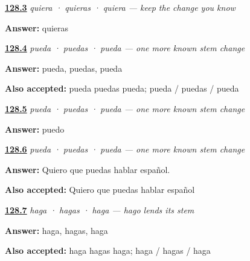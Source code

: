 \noindent\begin{minipage}[t]{\linewidth}
\raggedright
\hyperlink{review-ES-C18-querer-subjuntivo-wanted}{\textbf{128.3}} \emph{quiera · quieras · quiera — keep the change you know}\par
\small \textbf{Answer:} quieras\par
\end{minipage}\par\medskip

\noindent\begin{minipage}[t]{\linewidth}
\raggedright
\hyperlink{review-ES-C18-poder-subjuntivo-forms}{\textbf{128.4}} \emph{pueda · puedas · pueda — one more known stem change}\par
\small \textbf{Answer:} pueda, puedas, pueda\par
\footnotesize \textbf{Also accepted:} pueda puedas pueda; pueda / puedas / pueda
\end{minipage}\par\medskip

\noindent\begin{minipage}[t]{\linewidth}
\raggedright
\hyperlink{review-ES-C18-poder-subjuntivo-stem}{\textbf{128.5}} \emph{pueda · puedas · pueda — one more known stem change}\par
\small \textbf{Answer:} puedo\par
\end{minipage}\par\medskip

\noindent\begin{minipage}[t]{\linewidth}
\raggedright
\hyperlink{review-ES-C18-poder-subjuntivo-wanted}{\textbf{128.6}} \emph{pueda · puedas · pueda — one more known stem change}\par
\small \textbf{Answer:} Quiero que puedas hablar español.\par
\footnotesize \textbf{Also accepted:} Quiero que puedas hablar español
\end{minipage}\par\medskip

\noindent\begin{minipage}[t]{\linewidth}
\raggedright
\hyperlink{review-ES-C18-hacer-subjuntivo-forms}{\textbf{128.7}} \emph{haga · hagas · haga — hago lends its stem}\par
\small \textbf{Answer:} haga, hagas, haga\par
\footnotesize \textbf{Also accepted:} haga hagas haga; haga / hagas / haga
\end{minipage}\par\medskip


